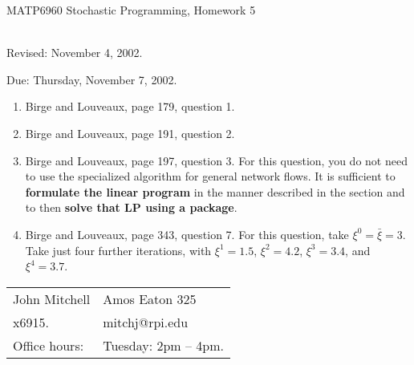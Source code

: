 \documentclass[12pt]{article}
\begin{document}
\begin{center}
  \begin{large}
     MATP6960 Stochastic Programming, Homework 5
  \end{large}
\\
Revised: November 4, 2002.
\end{center}

\begin{flushright}
   Due:  Thursday, November 7, 2002.
\end{flushright}

\vspace{\baselineskip}


\begin{enumerate}
\item Birge and Louveaux, page 179, question 1.
\item Birge and Louveaux, page 191, question 2.
\item Birge and Louveaux, page 197, question 3.
For this question, you do not need to use the specialized algorithm
for general network flows. It is sufficient to {\bf formulate
the linear program} in the manner described in the section
and to then {\bf solve that LP using a package}.
\item Birge and Louveaux, page 343, question 7.
For this question, take $\xi^0=\bar{\xi}=3$.
Take just four further iterations, with $\xi^1=1.5$,
$\xi^2=4.2$, $\xi^3=3.4$, and $\xi^4=3.7$.
\end{enumerate}

\vfill

\begin{tabular}{@{\hspace{.5in}}ll}
   John Mitchell  &
   Amos Eaton 325  \\
   x6915.  &
   mitchj@rpi.edu  \\
   Office hours:  &
   Tuesday: 2pm -- 4pm.
\end{tabular}
\end{document}
